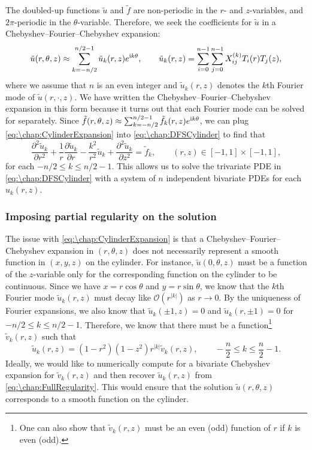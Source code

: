 The doubled-up functions $\tilde{u}$ and $\tilde{f}$ are non-periodic in the $r$- and $z$-variables, and $2\pi$-periodic in the $\theta$-variable.  Therefore, we seek the coefficients for $\tilde{u}$ in a Chebyshev--Fourier--Chebyshev expansion:
\begin{equation}
\tilde{u}(r,\theta,z) \approx \sum_{k=-n/2}^{n/2-1} \tilde{u}_k(r,z)e^{{\rm i} k \theta}, \qquad \tilde{u}_k(r,z) = \sum_{i=0}^{n-1} \sum_{j=0}^{n-1} X_{ij}^{(k)} T_i(r)T_j(z),
\label{eq:\chap:CylinderExpansion}
\end{equation}
where we assume that $n$ is an even integer and $\tilde{u}_k(r,z)$ denotes the $k$th Fourier mode of $\tilde{u}(r,\cdot,z)$. We have written the Chebyshev--Fourier--Chebyshev expansion in this form because it turns out that each Fourier mode can be solved for separately. Since $\tilde{f}(r,\theta,z) \approx \sum_{k=-n/2}^{n/2-1} \tilde{f}_k(r,z)e^{{\rm i} k \theta}$, we can plug \cref{eq:\chap:CylinderExpansion} into \cref{eq:\chap:DFSCylinder} to find that 
\begin{equation}
\frac{\partial^2 \tilde{u}_k}{\partial r^2} + \frac{1}{r}\frac{\partial  \tilde{u}_k}{\partial r} - \frac{k^2}{r^2}\tilde{u}_k + \frac{\partial^2 \tilde{u}_k}{\partial z^2} = \tilde{f}_k, \qquad (r,z)\in [-1,1]\times [-1,1],
\label{eq:\chap:EachFourierMode}
\end{equation} 
for each $-n/2\leq k\leq n/2-1$. This allows us to solve the trivariate PDE in \cref{eq:\chap:DFSCylinder} with a system of $n$ independent bivariate PDEs for each $u_k(r,z)$.

\subsubsection{Imposing partial regularity on the solution}
The issue with \cref{eq:\chap:CylinderExpansion} is that a Chebyshev--Fourier--Chebyshev expansion in $(r,\theta,z)$ does not necessarily represent a smooth function in $(x,y,z)$ on the cylinder. For instance, $\tilde{u}(0,\theta,z)$ must be a function of the $z$-variable only for the corresponding function on the cylinder to be continuous. Since we have $x = r\cos\theta$ and $y=r\sin\theta$, we know that the $k$th Fourier mode $\tilde{u}_k(r,z)$ must decay like $\mathcal{O}(r^{|k|})$ as $r\rightarrow 0$.  By the uniqueness of Fourier expansions, we also know that $\tilde{u}_k(\pm 1,z) =0$ and $\tilde{u}_k(r,\pm1)=0$ for $-n/2\leq k\leq n/2-1$. Therefore, we know that there must be a function\footnote{One can also show that $\tilde{v}_k(r,z)$ must be an even (odd) function of $r$ if $k$ is even (odd).} $\tilde{v}_k(r,z)$ such that 
\begin{equation}
\tilde{u}_k(r,z) = (1-r^2)(1-z^2) r^{|k|} \tilde{v}_k(r,z), \qquad -\frac{n}{2}\leq k\leq \frac{n}{2}-1. 
\label{eq:\chap:FullRegularity}
\end{equation}
Ideally, we would like to numerically compute for a bivariate Chebyshev expansion for $\tilde{v}_k(r,z)$ and then recover $\tilde{u}_k(r,z)$ from \cref{eq:\chap:FullRegularity}. This would ensure that the solution $\tilde{u}(r,\theta,z)$ corresponds to a smooth function on the cylinder. 


